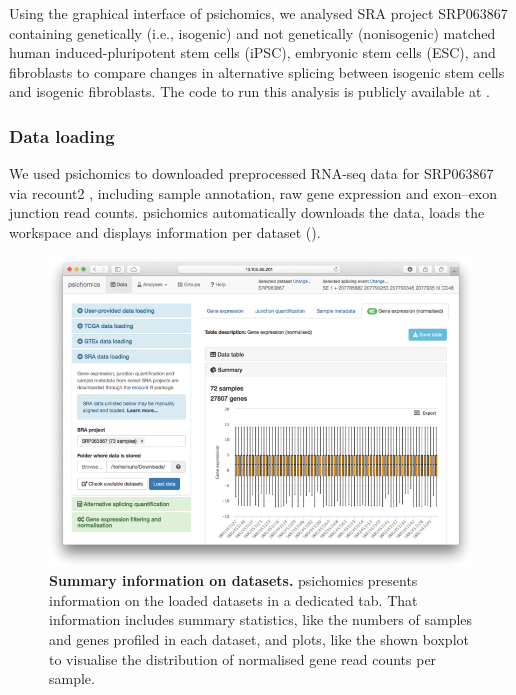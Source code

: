 
Using the graphical interface of psichomics, we analysed SRA project SRP063867 \cite{choi:2015tu} containing genetically (i.e., isogenic) and not genetically (nonisogenic) matched human induced-pluripotent stem cells (iPSC), embryonic stem cells (ESC), and fibroblasts to compare changes in alternative splicing between isogenic stem cells and isogenic fibroblasts. The code to run this analysis is publicly available at .

\subsubsection{Data loading}

We used psichomics to downloaded preprocessed RNA-seq data for SRP063867 via recount2 \cite{collado-torres:2017uw}, including sample annotation, raw gene expression and exon–exon junction read counts. psichomics automatically downloads the data, loads the workspace and displays information per dataset ().

\begin{figure}[!h]
  \includegraphics[width=1\textwidth]{images/psichomics/0-gene-expr-summary}
  \centering
  \caption[Summary information on datasets]{\textbf{Summary information on datasets.} psichomics presents information on the loaded datasets in a dedicated tab. That information includes summary statistics, like the numbers of samples and genes profiled in each dataset, and plots, like the shown boxplot to visualise the distribution of normalised gene read counts per sample.}
  \label{fig:psichomics-gene-expr-summary}
\end{figure}

